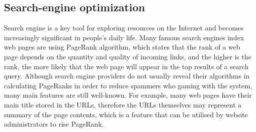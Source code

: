 


\subsection{Search-engine optimization} 

Search engine is a key tool for
exploring resources on the Internet and becomes increasingly significant in
people's daily life. Many famous search engines index web pages are using PageRank
algorithm, which states that the rank of a web page depends on the quantity and
quality of incoming links, and the higher is the rank, the more likely that the
web page will appear in the top results of a search query. Although search
engine providers do not usually reveal their algorithms in calculating
PageRanks in order to reduce spammers who gaming with the system, many main
features are still well-known. For example, many web pages have their main title
stored in the URLs, therefore the URLs themselves may represent a summary of the
page contents, which is a feature that can be utilised by website administrators 
to rise PageRank.
